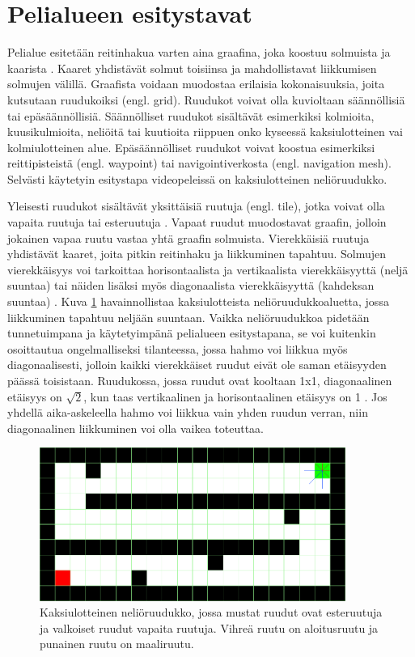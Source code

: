 \documentclass[utf8]{gradu3}
\begin{document}
\section{Pelialueen esitystavat}

Pelialue esitetään reitinhakua varten aina graafina, joka koostuu solmuista ja kaarista \parencite{lawande2022systematic}. Kaaret yhdistävät solmut toisiinsa ja mahdollistavat liikkumisen solmujen välillä. Graafista voidaan muodostaa erilaisia kokonaisuuksia, joita kutsutaan ruudukoiksi (engl. grid). Ruudukot voivat olla kuvioltaan säännöllisiä tai epäsäännöllisiä. Säännölliset ruudukot sisältävät esimerkiksi kolmioita, kuusikulmioita, neliöitä tai kuutioita riippuen onko kyseessä kaksiulotteinen vai kolmiulotteinen alue. Epäsäännölliset ruudukot voivat koostua esimerkiksi reittipisteistä (engl. waypoint) tai navigointiverkosta (engl. navigation mesh). Selvästi käytetyin esitystapa videopeleissä on kaksiulotteinen neliöruudukko.

Yleisesti ruudukot sisältävät yksittäisiä ruutuja (engl. tile), jotka voivat olla vapaita ruutuja tai esteruutuja \parencite{botea2013pathfinding}. Vapaat ruudut muodostavat graafin, jolloin jokainen vapaa ruutu vastaa yhtä graafin solmuista. Vierekkäisiä ruutuja yhdistävät kaaret, joita pitkin reitinhaku ja liikkuminen tapahtuu. Solmujen vierekkäisyys voi tarkoittaa horisontaalista ja vertikaalista vierekkäisyyttä (neljä suuntaa) tai näiden lisäksi myös diagonaalista vierekkäisyyttä (kahdeksan suuntaa) \parencite{abd2015comprehensive,botea2013pathfinding}. Kuva \ref{ruudukkokuva} havainnollistaa kaksiulotteista neliöruudukkoaluetta, jossa liikkuminen tapahtuu neljään suuntaan. Vaikka neliöruudukkoa pidetään tunnetuimpana ja käytetyimpänä pelialueen esitystapana, se voi kuitenkin osoittautua ongelmalliseksi tilanteessa, jossa hahmo voi liikkua myös diagonaalisesti, jolloin kaikki vierekkäiset ruudut eivät ole saman etäisyyden päässä toisistaan. Ruudukossa, jossa ruudut ovat kooltaan 1x1, diagonaalinen etäisyys on $\sqrt{2}$, kun taas vertikaalinen ja horisontaalinen etäisyys on 1 \parencite{panov2018grid}. Jos yhdellä aika-askeleella hahmo voi liikkua vain yhden ruudun verran, niin diagonaalinen liikkuminen voi olla vaikea toteuttaa.

\begin{figure}[h]
\centering
\includegraphics[width=10cm]{ruudukko_kuva.png}
\caption{Kaksiulotteinen neliöruudukko, jossa mustat ruudut ovat esteruutuja ja valkoiset ruudut vapaita ruutuja. Vihreä ruutu on aloitusruutu ja punainen ruutu on maaliruutu.}
\label{ruudukkokuva}
\end{figure}
\end{document}
